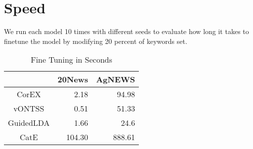 \documentclass[11pt]{article}
\begin{document}
\section{Speed}
We run each model 10 times with different seeds to evaluate how long it takes to finetune the model by modifying 20 percent of keywords set. 
\begin{table*}[ ]

\centering
\begin{tabular}{| c| r| r } 
\hline
\multicolumn{1}{c}{} \vline &
\multicolumn{1}{c}{20News}\vline  & \multicolumn{1}{c}{AgNEWS} \vline \\
\hline
\multicolumn{1}{c}{CorEX} \vline & 2.18 &  94.98\\
\multicolumn{1}{c}{vONTSS} \vline & 0.51 &  51.33 \\
\multicolumn{1}{c}{GuidedLDA} \vline & 1.66 & 24.6 \\
\multicolumn{1}{c}{CatE} \vline & 104.30 & 888.61\\
\hline
\end{tabular}
\caption{\label{speed:tab}Fine Tuning in Seconds}
\end{table*}
\end{document}
